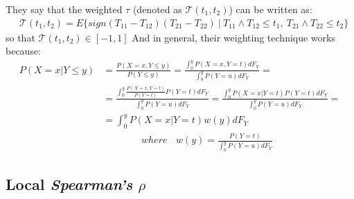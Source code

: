 \documentclass[]{article}
\begin{document}
They say that the weighted $\tau$ (denoted as $\mathcal{T}(t_1, t_2)$) can be written as:
	$$
	\begin{aligned}
		&\mathcal{T}(t_1, t_2) = E\{sign(T_{11} - T_{12}) (T_{21} - T_{22})~|~ T_{11}\wedge T_{12} \leq t_1,~T_{21}\wedge T_{22} \leq t_2  \}
	\end{aligned}
	$$
	so that $\mathcal{T}(t_1, t_2) \in [-1,1]$
And in general, their weighting technique works because:
	$$
	\begin{aligned}
		P(X=x|Y\leq y) &= \frac{P(X=x, Y\leq y)}{P(Y\leq y)} 
    =\frac{\int_0^y P(X=x, Y = t)dF_Y}{\int_0^y P(Y= u)dF_Y}  = \\
    &=\frac{\int_0^y \frac{P(X=x, Y = t)}{P(Y = t)}P(Y = t)dF_Y}{\int_0^y P(Y= u)dF_Y} =\frac{\int_0^y P(X=x | Y = t)P(Y = t)dF_Y}{\int_0^y P(Y= u)dF_Y}=\\
&=\int_0^y P(X=x | Y = t)w(y)dF_Y\\
&~~~~~~~~~~~~~~~~~~where~~~~w(y) = \frac{P(Y = t)}{\int_0^y P(Y= u)dF_Y}
	\end{aligned}
	$$

\subsection{Local \emph{Spearman's} $\rho$}
\end{document}
